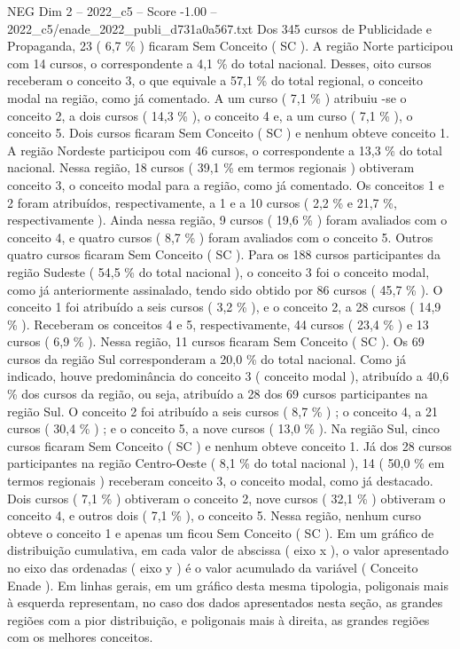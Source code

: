 \begin{textsample}{NEG Dim 2 – 2022\_c5 – Score -1.00 – 2022\_c5/enade\_2022\_publi\_d731a0a567.txt}
Dos 345 cursos de Publicidade e Propaganda, 23 ( 6,7 \% ) ficaram Sem Conceito ( SC ).
A região Norte participou com 14 cursos, o correspondente a 4,1 \% do total nacional.
Desses, oito cursos receberam o conceito 3, o que equivale a 57,1 \% do total regional, o conceito modal na região, como já comentado.
A um curso ( 7,1 \% ) atribuiu -se o conceito 2, a dois cursos ( 14,3 \% ), o conceito 4 e, a um curso ( 7,1 \% ), o conceito 5.
Dois cursos ficaram Sem Conceito ( SC ) e nenhum obteve conceito 1.
A região Nordeste participou com 46 cursos, o correspondente a 13,3 \% do total nacional.
Nessa região, 18 cursos ( 39,1 \% em termos regionais ) obtiveram conceito 3, o conceito modal para a região, como já comentado.
Os conceitos 1 e 2 foram atribuídos, respectivamente, a 1 e a 10 cursos ( 2,2 \% e 21,7 \%, respectivamente ).
Ainda nessa região, 9 cursos ( 19,6 \% ) foram avaliados com o conceito 4, e quatro cursos ( 8,7 \% ) foram avaliados com o conceito 5.
Outros quatro cursos ficaram Sem Conceito ( SC ).
Para os 188 cursos participantes da região Sudeste ( 54,5 \% do total nacional ), o conceito 3 foi o conceito modal, como já anteriormente assinalado, tendo sido obtido por 86 cursos ( 45,7 \% ).
O conceito 1 foi atribuído a seis cursos ( 3,2 \% ), e o conceito 2, a 28 cursos ( 14,9 \% ).
Receberam os conceitos 4 e 5, respectivamente, 44 cursos ( 23,4 \% ) e 13 cursos ( 6,9 \% ).
Nessa região, 11 cursos ficaram Sem Conceito ( SC ).
Os 69 cursos da região Sul corresponderam a 20,0 \% do total nacional.
Como já indicado, houve predominância do conceito 3 ( conceito modal ), atribuído a 40,6 \% dos cursos da região, ou seja, atribuído a 28 dos 69 cursos participantes na região Sul.
O conceito 2 foi atribuído a seis cursos ( 8,7 \% ) ; o conceito 4, a 21 cursos ( 30,4 \% ) ; e o conceito 5, a nove cursos ( 13,0 \% ).
Na região Sul, cinco cursos ficaram Sem Conceito ( SC ) e nenhum obteve conceito 1.
Já dos 28 cursos participantes na região Centro-Oeste ( 8,1 \% do total nacional ), 14 ( 50,0 \% em termos regionais ) receberam conceito 3, o conceito modal, como já destacado.
Dois cursos ( 7,1 \% ) obtiveram o conceito 2, nove cursos ( 32,1 \% ) obtiveram o conceito 4, e outros dois ( 7,1 \% ), o conceito 5.
Nessa região, nenhum curso obteve o conceito 1 e apenas um ficou Sem Conceito ( SC ).
Em um gráfico de distribuição cumulativa, em cada valor de abscissa ( eixo x ), o valor apresentado no eixo das ordenadas ( eixo y ) é o valor acumulado da variável ( Conceito Enade ).
Em linhas gerais, em um gráfico desta mesma tipologia, poligonais mais à esquerda representam, no caso dos dados apresentados nesta seção, as grandes regiões com a pior distribuição, e poligonais mais à direita, as grandes regiões com os melhores conceitos.

\end{textsample}
